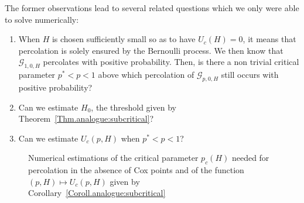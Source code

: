 \documentclass[10pt,a4paper]{amsart}
\theoremstyle{exampstyle}
\theoremstyle{exampnotations}
\begin{document}
The former observations lead to several related questions which we only were able to solve numerically:
\begin{enumerate}
    \item When $H$ is chosen sufficiently small so as to have $U_c(H)=0$, it means that percolation is solely ensured by the Bernoulli process. We then know that $\mathcal{G}_{1,0,H}$ percolates with positive probability. Then, is there a non trivial critical parameter $p^*<p<1$ above which percolation  of $\mathcal{G}_{p,0,H}$ still occurs with positive probability?
    \item Can we estimate $H_0$, the threshold given by Theorem~\ref{Thm.analogue:subcritical}?
    \item Can we estimate $U_c(p,H)$ when $p^* < p < 1$?
\end{enumerate}
\begin{figure}[h!]
\centering
\setlength{\lineskip}{\medskipamount}
\hfill
{}\hfill
\caption{Numerical estimations of the critical parameter $p_c(H)$ needed for percolation in the absence of Cox points and of the function $(p,H) \mapsto U_c(p,H)$ given by  Corollary~\ref{Coroll.analogue:subcritical}} \label{fig:additionalquestions}
\end{figure}
\end{document}
